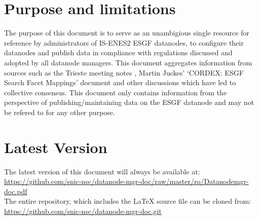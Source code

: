 \section{Purpose and limitations}
The purpose of this document is to serve as an unambigious single resource for reference by administrators of IS-ENES2 ESGF datanodes, to configure their datanodes and publish data in compliance with regulations discussed and adopted by all datanode managers. This document aggregates information from sources such as the Trieste meeting notes \cite{trieste}, Martin Juckes' `CORDEX: ESGF Search Facet Mappings' document \cite{cordexfacetsdoc} and other discussions which have led to collective consensus. This document only contains information from the perspective of publishing/maintaining data on the ESGF datanode and may not be refered to for any other purpose.

\section{Latest Version}
The latest version of this document will always be available at:\\
\url{https://github.com/snic-nsc/datanode-mgr-doc/raw/master/ro/Datanodemgr-doc.pdf} \\
The entire repository, which includes the \LaTeX{} source file can be cloned from:\\
\url{https://github.com/snic-nsc/datanode-mgr-doc.git}


